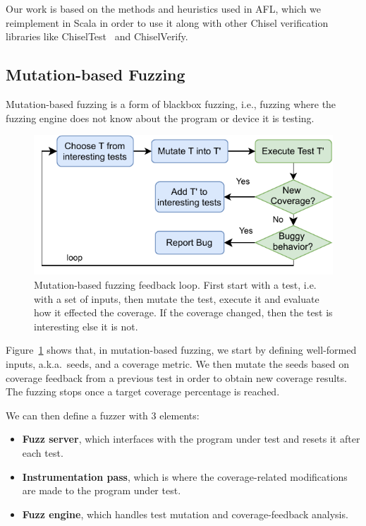 \documentclass[conference]{IEEEtran}
\begin{document}
Our work is based on the methods and heuristics used in AFL, which we reimplement in Scala in order to use it along with other Chisel verification libraries like ChiselTest~\cite{chisel:tester2} and ChiselVerify.

\subsection{Mutation-based Fuzzing}
Mutation-based fuzzing is a form of blackbox fuzzing, i.e., fuzzing where the fuzzing engine does not know about the program or device it is testing.
\begin{figure}
  \centering
    \includegraphics[width=0.9\linewidth]{mutation-fuzzing.pdf}
    \caption{Mutation-based fuzzing feedback loop. First start with a test, i.e.\, with a set of inputs, then mutate the test, execute it and evaluate how it effected the coverage. If the coverage changed, then the test is interesting else it is not.}
\label{fig:mut-fuzz}
\end{figure}

Figure~\ref{fig:mut-fuzz} shows that, in mutation-based fuzzing, we start by defining well-formed inputs, a.k.a.\ seeds, and a coverage metric. 
We then mutate the seeds based on coverage feedback from a previous test in order to obtain new coverage results. 
The fuzzing stops once a target coverage percentage is reached.

We can then define a fuzzer with 3 elements:
\begin{itemize}
\item \textbf{Fuzz server}, which interfaces with the program under test and resets it after each test.
\item \textbf{Instrumentation pass}, which is where the coverage-related modifications are made to the program under test.
\item \textbf{Fuzz engine}, which handles test mutation and coverage-feedback analysis.
\end{itemize}
\end{document}
